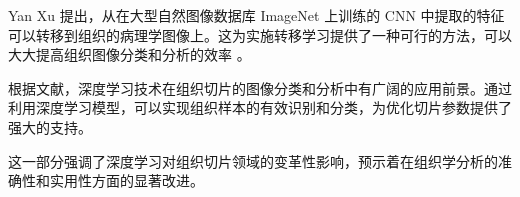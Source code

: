 Yan Xu 提出，从在大型自然图像数据库 ImageNet 上训练的 CNN 中提取的特征可以转移到组织的病理学图像上。这为实施转移学习提供了一种可行的方法，可以大大提高组织图像分类和分析的效率 \cite{LR.9}。

根据文献，深度学习技术在组织切片的图像分类和分析中有广阔的应用前景。通过利用深度学习模型，可以实现组织样本的有效识别和分类，为优化切片参数提供了强大的支持。

这一部分强调了深度学习对组织切片领域的变革性影响，预示着在组织学分析的准确性和实用性方面的显著改进。

\FloatBarrier %
